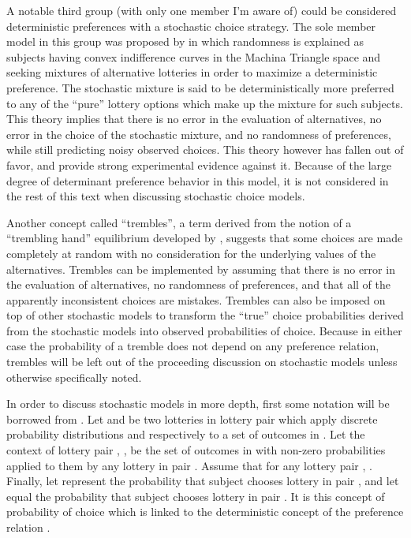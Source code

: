 A notable third group (with only one member I'm aware of) could be considered deterministic preferences with a stochastic choice strategy.
The sole member model in this group was proposed by \textcite{Machina1985} in which randomness is explained as subjects having convex indifference curves in the Machina Triangle space \textcite{Machina1987} and seeking mixtures of alternative lotteries in order to maximize a deterministic preference.
The stochastic mixture is said to be deterministically more preferred to any of the \enquote{pure} lottery options which make up the mixture for such subjects.
This theory implies that there is no error in the evaluation of alternatives, no error in the choice of the stochastic mixture, and no randomness of preferences, while still predicting noisy observed choices.
This theory however has fallen out of favor, and \textcite{Hey1995} provide strong experimental evidence against it.
Because of the large degree of determinant preference behavior in this model, it is not considered in the rest of this text when discussing stochastic choice models.

Another concept called \enquote{trembles}, a term derived from the notion of a \enquote{trembling hand} equilibrium developed by \textcite{Selten1975}, suggests that some choices are made completely at random with no consideration for the underlying values of the alternatives.
Trembles can be implemented by assuming that there is no error in the evaluation of alternatives, no randomness of preferences, and that all of the apparently inconsistent choices are mistakes.
Trembles can also be imposed on top of other stochastic models to transform the \enquote{true} choice probabilities derived from the stochastic models into observed probabilities of choice.
Because in either case the probability of a tremble does not depend on any preference relation, trembles will be left out of the proceeding discussion on stochastic models unless otherwise specifically noted.

In order to discuss stochastic models in more depth, first some notation will be borrowed from \textcite{Wilcox2008}.
Let  and  be two lotteries in lottery pair  which apply discrete probability distributions  and  respectively to a set of  outcomes in .
Let the context of lottery pair , , be the set of outcomes in  with non-zero probabilities applied to them by any lottery in pair .
Assume that for any lottery pair , .
Finally, let  represent the probability that subject  chooses lottery  in pair , and let  equal the probability that subject  chooses lottery  in pair .
It is this concept of probability of choice which is linked to the deterministic concept of the preference relation .



